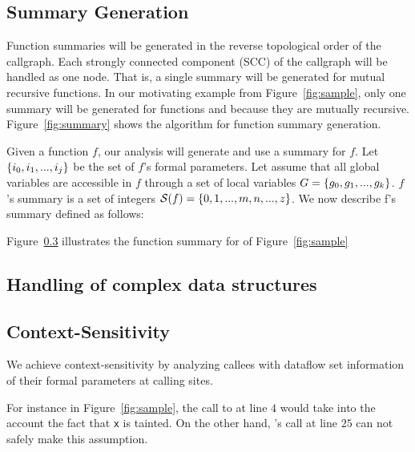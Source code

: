 \subsection{Summary Generation}\label{sec:summaries}

Function summaries will be generated in the reverse
topological order of the callgraph. Each strongly connected
component (SCC) of the callgraph will be handled as one
node. That is, a single summary will be generated for
mutual recursive functions. In our motivating example
from Figure~\ref{fig:sample}, only one summary will
be generated for functions \even{} and \odd{} because they
are mutually recursive.
Figure~\ref{fig:summary} shows the algorithm for function
summary generation.

Given a function $f$, our analysis will generate and use
a summary for $f$. Let $\{i_0, i_1, ..., i_j\}$ be the set
of $f$'s formal parameters. Let assume that all global variables
are accessible in $f$ through a set of local variables 
$G = \{g_0, g_1, ..., g_k\}$. $f$'s summary is a set of integers 
$\mathcal{S}(f) = \{0, 1, ...,m, n, ..., z\}$.
We now describe f's summary 
defined as follows: 

Figure~\ref{} illustrates the function summary for \main{}
of Figure~\ref{fig:sample}

\subsection{Handling of complex data structures}

\subsection{Context-Sensitivity} 

We achieve context-sensitivity by analyzing callees
with dataflow set information of their formal parameters
at calling sites.

For instance in Figure~\ref{fig:sample}, the call to \even{} at
line $4$ would take into the account the fact that \texttt{x}
is tainted.
On the other hand, \even{}'s call at line $25$ can not safely
make this assumption.